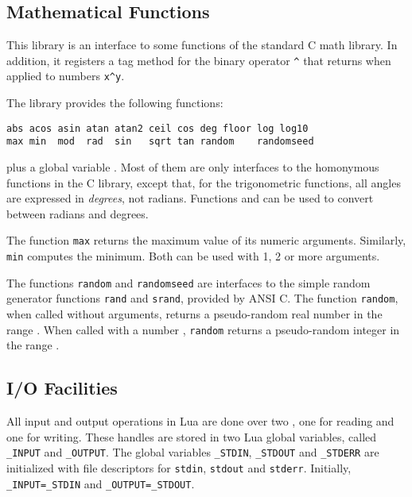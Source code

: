 \subsection{Mathematical Functions} \label{mathlib}

This library is an interface to some functions of the standard C math library.
In addition, it registers a tag method for the binary operator \verb|^| that
returns  when applied to numbers \verb|x^y|.

The library provides the following functions:
\begin{verbatim}
abs acos asin atan atan2 ceil cos deg floor log log10
max min  mod  rad  sin   sqrt tan random    randomseed
\end{verbatim}
plus a global variable .
Most of them
are only interfaces to the homonymous functions in the C library,
except that, for the trigonometric functions,
all angles are expressed in \emph{degrees}, not radians.
Functions  and  can be used to convert
between radians and degrees.

The function \verb|max| returns the maximum
value of its numeric arguments.
Similarly, \verb|min| computes the minimum.
Both can be used with 1, 2 or more arguments.

The functions \verb|random| and \verb|randomseed| are interfaces to
the simple random generator functions \verb|rand| and \verb|srand|,
provided by ANSI C.
The function \verb|random|, when called without arguments,
returns a pseudo-random real number in the range \Math{[0,1)}.
When called with a number ,
\verb|random| returns a pseudo-random integer in the range \Math{[1,n]}.


\subsection{I/O Facilities} \label{libio}

All input and output operations in Lua are done over two
, one for reading and one for writing.
These handles are stored in two Lua global variables,
called \verb|_INPUT| and \verb|_OUTPUT|.
The global variables
\verb|_STDIN|, \verb|_STDOUT| and \verb|_STDERR|
are initialized with file descriptors for
\verb|stdin|, \verb|stdout| and \verb|stderr|.
Initially, \verb|_INPUT=_STDIN| and \verb|_OUTPUT=_STDOUT|.

